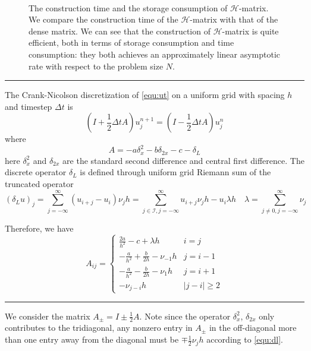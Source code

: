 \documentclass[10pt,a4paper]{article}
\theoremstyle{definition}
\begin{document}
\begin{figure}[htpb]
\centering
\scalebox{0.4}{}~
\scalebox{0.4}{}
\caption{The construction time and the storage consumption of $\mathcal{H}$-matrix. We compare the construction time of the $\mathcal{H}$-matrix with that of the dense matrix. We can see that the construction of $\mathcal{H}$-matrix is quite efficient, both in terms of storage consumption and time consumption: they both achieves an approximately linear asymptotic rate with respect to the problem size $N$.}
\label{fig:construction}
\end{figure}

\hrule


The Crank-Nicolson discretization of \cref{equ:ut} on a uniform grid with spacing $h$ and timestep $\Delta t$ is 
\begin{equation}
	(I+\frac{1}{2}\Delta tA)u_j^{n+1} = (I-\frac{1}{2}\Delta tA)u_j^n
\end{equation}
where 
\begin{equation}
	A = -a\delta_x^2 - b\delta_{2x} - c - \delta_L
\end{equation}
here $\delta_x^2$ and $\delta_{2x}$ are the standard second difference and central first difference. The discrete operator $\delta_L$ is defined through uniform grid Riemann sum of the truncated operator
\begin{equation}\label{equ:dl}
	(\delta_L u)_j = \sum_{j=-\infty}^\infty (u_{i+j}-u_i)\nu_j h =  \sum_{j\in \mathcal{I}, j=-\infty}^\infty u_{i+j}\nu_j h - u_i \lambda h\quad \lambda = \sum_{j\neq 0, j=-\infty}^\infty \nu_j
\end{equation}

Therefore, we have
\begin{equation}\label{equ:Aij}
  {A_{ij}} = 
  \begin{cases}
  	{\frac{{2a}}{{{h^2}}} - c + \lambda h} & i=j\\
{ - \frac{a}{{{h^2}}} + \frac{b}{{2h}} - {\nu _{ - 1}h}} & j=i-1\\
{ - \frac{a}{{{h^2}}} - \frac{b}{{2h}} - {\nu _1}h} & j=i+1\\
{ - {\nu _{j - i}h}} & |j-i|\geq 2
  \end{cases}
\end{equation}
\hrule

We consider the matrix $A_\pm = I \pm \frac{1}{2}A$. Note since the operator $\delta_x^2$, $\delta_{2x}$ only contributes to the tridiagonal, any nonzero entry in $A_\pm$ in the off-diagonal more than one entry away from the diagonal must be $\mp\frac{1}{2}\nu_jh$ according to \cref{equ:dl}. 
\end{document}
